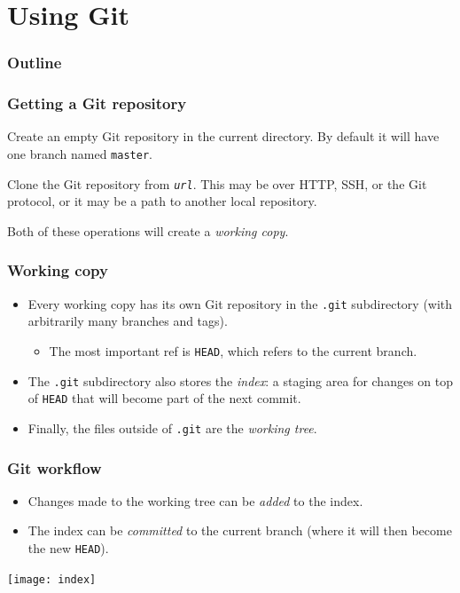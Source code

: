 \documentclass{beamer}
\begin{document}
\section{Using Git}

\begin{frame}
  \frametitle{Outline}
  \tableofcontents[currentsection]
\end{frame}

\begin{frame}
  \frametitle{Getting a Git repository}

  \begin{description}
  \item[\texttt{git init}] Create an empty Git repository in the
    current directory.  By default it will have one branch named
    \texttt{master}.
  \item[\texttt{git clone \textit{url}}] Clone the Git repository from
    \texttt{\textit{url}}.  This may be over HTTP, SSH, or the Git
    protocol, or it may be a path to another local repository.
  \end{description}

  Both of these operations will create a \emph{working copy}.
\end{frame}

\begin{frame}
  \frametitle{Working copy}
  \begin{itemize}
  \item Every working copy has its own Git repository in the
    \texttt{.git} subdirectory (with arbitrarily many branches and
    tags).
    \begin{itemize}
    \item The most important ref is \texttt{HEAD}, which refers to the
      current branch.
    \end{itemize}
  \item The \texttt{.git} subdirectory also stores the \emph{index}: a
    staging area for changes on top of \texttt{HEAD} that will become
    part of the next commit.
  \item Finally, the files outside of \texttt{.git} are the
    \emph{working tree}.
  \end{itemize}
\end{frame}

\begin{frame}
  \frametitle{Git workflow}
  \begin{itemize}
  \item Changes made to the working tree can be \emph{added} to the
    index.
  \item The index can be \emph{committed} to the current branch (where
    it will then become the new \texttt{HEAD}).
  \end{itemize}

  \begin{center}
    \texttt{[image: index]}
  \end{center}
\end{frame}
\end{document}
